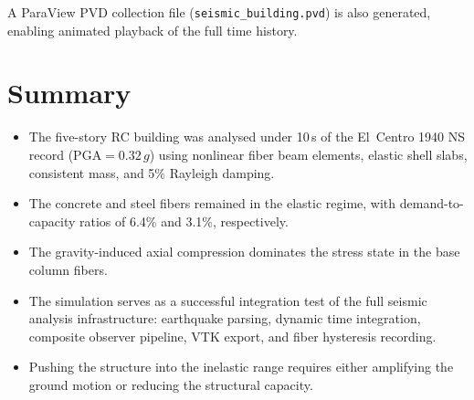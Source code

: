 A ParaView PVD collection file (\texttt{seismic\_building.pvd}) is
also generated, enabling animated playback of the full time history.


\section{Summary}
\label{sec:seismic-rc-summary}

\begin{itemize}
  \item The five-story RC building was analysed under 10\,s of the
        El~Centro 1940 NS record ($\mathrm{PGA} = 0.32\,g$) using
        nonlinear fiber beam elements, elastic shell slabs, consistent
        mass, and 5\% Rayleigh damping.
  \item The concrete and steel fibers remained in the elastic regime,
        with demand-to-capacity ratios of 6.4\% and 3.1\%, respectively.
  \item The gravity-induced axial compression dominates the stress state
        in the base column fibers.
  \item The simulation serves as a successful integration test of the
        full seismic analysis infrastructure: earthquake parsing, dynamic
        time integration, composite observer pipeline, VTK export, and
        fiber hysteresis recording.
  \item Pushing the structure into the inelastic range requires either
        amplifying the ground motion or reducing the structural capacity.
\end{itemize}
